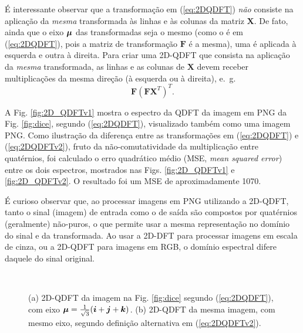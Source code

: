 \'E interessante observar que a transforma\c c\~ao em (\ref{eq:2DQDFT}) \textit{n\~ao} consiste na aplica\c c\~ao da \textit{mesma} transformada \`as linhas e \`as colunas da matriz $ \mathbf{X} $. De fato, ainda que o eixo $ \boldsymbol{\mu} $ das transformadas seja o mesmo (como o \'e em (\ref{eq:2DQDFT}), pois a matriz de transforma\c c\~ao $ \mathbf{F} $ \'e a mesma), uma \'e aplicada \`a esquerda e outra \`a direita. Para criar uma 2D-QDFT que consista na aplica\c c\~ao da \textit{mesma} transformada, as linhas e as colunas de $ \mathbf{X} $ devem receber multiplica\c c\~oes da mesma dire\c c\~ao (\`a esquerda ou \`a direita), e.~g.
\begin{equation}
\label{eq:2DQDFTv2}
\mathbf{F} \left( \mathbf{F}\mathbf{X}^T \right)^T.
\end{equation}

A Fig. \ref{fig:2D_QDFTv1} mostra o espectro da QDFT da imagem em PNG da Fig. \ref{fig:dice}, segundo (\ref{eq:2DQDFT}), visualizado tamb\'em como uma imagem PNG. Como ilustra\c c\~ao da diferen\c ca entre as transforma\c c\~oes em (\ref{eq:2DQDFT}) e (\ref{eq:2DQDFTv2}), fruto da n\~ao-comutatividade da multiplica\c c\~ao entre quat\'ernios, foi calculado o erro quadr\'atico m\'edio (MSE, \textit{mean squared error}) entre os dois espectros, mostrados nas Figs. \ref{fig:2D_QDFTv1} e \ref{fig:2D_QDFTv2}. O resultado foi um MSE de aproximadamente 1070. %

\'E curioso observar que, ao processar imagens em PNG utilizando a 2D-QDFT, tanto o sinal (imagem) de entrada como o de sa\'ida s\~ao compostos por quat\'ernios (geralmente) n\~ao-puros, o que permite usar a mesma representa\c c\~ao no dom\'inio do sinal e da transformada. Ao usar a 2D-DFT para processar imagens em escala de cinza, ou a 2D-QDFT para imagens em RGB, o dom\'inio espectral difere daquele do sinal original.

\begin{figure}
	\centering
	~
	\caption{(a) 2D-QDFT da imagem na Fig. \ref{fig:dice} segundo (\ref{eq:2DQDFT}), com eixo $ \boldsymbol{\mu} = \frac{1}{\sqrt{3}}(\boldsymbol{i} + \boldsymbol{j} + \boldsymbol{k}) $. (b) 2D-QDFT da mesma imagem, com mesmo eixo, segundo defini\c c\~ao alternativa em (\ref{eq:2DQDFTv2}).}
	\label{fig:QDFT}
\end{figure}

